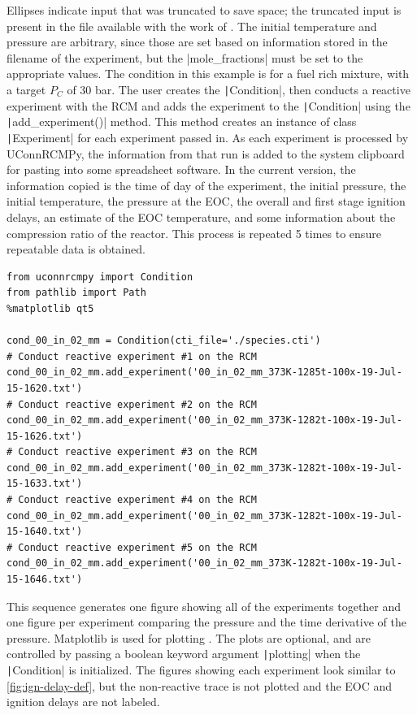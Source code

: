 \documentclass[12pt]{../ussci}
\begin{document}
Ellipses indicate input that was truncated to save space; the truncated
input is present in the file available with the work of \textcite{Dames2016}. The
initial temperature and pressure are arbitrary, since those are set
based on information stored in the filename of the experiment, but the
\python|mole_fractions| must be set to the appropriate values. The
condition in this example is for a fuel rich mixture, with a target
\(P_C\) of 30 bar. The user creates the \texttt|Condition|, then
conducts a reactive experiment with the RCM and adds the experiment to
the \texttt|Condition| using the \texttt|add_experiment()| method. This
method creates an instance of class \texttt|Experiment| for each
experiment passed in. As each experiment is processed by UConnRCMPy, the
information from that run is added to the system clipboard for pasting
into some spreadsheet software. In the current version, the information
copied is the time of day of the experiment, the initial pressure, the
initial temperature, the pressure at the EOC, the overall and first
stage ignition delays, an estimate of the EOC temperature, and some
information about the compression ratio of the reactor. This process is
repeated 5 times to ensure repeatable data is obtained.

\begin{verbatim}
from uconnrcmpy import Condition
from pathlib import Path
%matplotlib qt5

cond_00_in_02_mm = Condition(cti_file='./species.cti')
# Conduct reactive experiment #1 on the RCM
cond_00_in_02_mm.add_experiment('00_in_02_mm_373K-1285t-100x-19-Jul-15-1620.txt')
# Conduct reactive experiment #2 on the RCM
cond_00_in_02_mm.add_experiment('00_in_02_mm_373K-1282t-100x-19-Jul-15-1626.txt')
# Conduct reactive experiment #3 on the RCM
cond_00_in_02_mm.add_experiment('00_in_02_mm_373K-1282t-100x-19-Jul-15-1633.txt')
# Conduct reactive experiment #4 on the RCM
cond_00_in_02_mm.add_experiment('00_in_02_mm_373K-1282t-100x-19-Jul-15-1640.txt')
# Conduct reactive experiment #5 on the RCM
cond_00_in_02_mm.add_experiment('00_in_02_mm_373K-1282t-100x-19-Jul-15-1646.txt')
\end{verbatim}

This sequence generates one figure showing all of the experiments
together and one figure per experiment comparing the pressure and the
time derivative of the pressure. Matplotlib is used for plotting
\autocite{Hunter2007}. The plots are optional, and are controlled by
passing a boolean keyword argument \texttt|plotting| when the
\texttt|Condition| is initialized. The figures showing each experiment
look similar to \cref{fig:ign-delay-def}, but the non-reactive
trace is not plotted and the EOC and ignition delays are not labeled.
\end{document}

